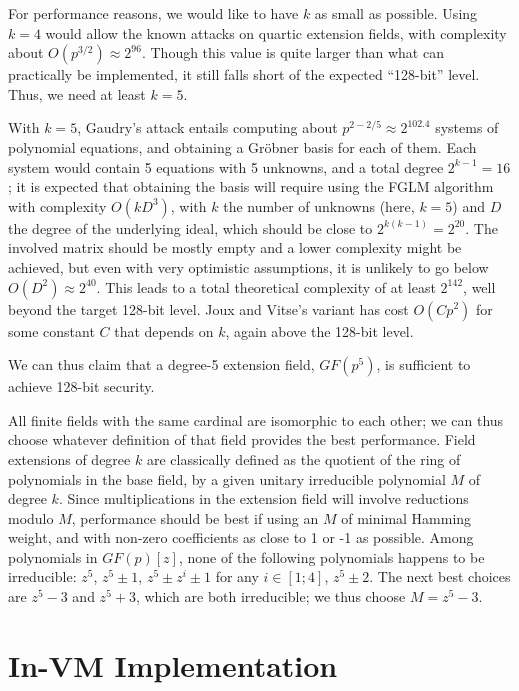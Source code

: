 \documentclass{llncs}
\newcommand{\GF}{GF}
\begin{document}
For performance reasons, we would like to have $k$ as small as possible.
Using $k = 4$ would allow the known attacks on quartic extension
fields\cite{AriMatNagShi2004}, with complexity about $O(p^{3/2}) \approx
2^{96}$. Though this value is quite larger than what can practically be
implemented, it still falls short of the expected ``128-bit'' level.
Thus, we need at least $k = 5$.

With $k = 5$, Gaudry's attack entails computing about $p^{2-2/5} \approx
2^{102.4}$ systems of polynomial equations, and obtaining a Gröbner
basis for each of them. Each system would contain 5 equations with 5
unknowns, and a total degree $2^{k-1} = 16$; it is expected that
obtaining the basis will require using the FGLM
algorithm\cite{FauGiaLazMor1993} with complexity $O(k D^3)$, with $k$
the number of unknowns (here, $k = 5$) and $D$ the degree of the
underlying ideal, which should be close to $2^{k(k-1)} = 2^{20}$. The
involved matrix should be mostly empty and a lower complexity might be
achieved, but even with very optimistic assumptions, it is unlikely to
go below $O(D^2) \approx 2^{40}$. This leads to a total theoretical
complexity of at least $2^{142}$, well beyond the target 128-bit level.
Joux and Vitse's variant has cost $O(C p^2)$ for some constant $C$ that
depends on $k$, again above the 128-bit level.

We can thus claim that a degree-5 extension field, $\GF(p^5)$, is
sufficient to achieve 128-bit security.

All finite fields with the same cardinal are isomorphic to each other;
we can thus choose whatever definition of that field provides the best
performance. Field extensions of degree $k$ are classically defined as
the quotient of the ring of polynomials in the base field, by a given
unitary irreducible polynomial $M$ of degree $k$. Since multiplications
in the extension field will involve reductions modulo $M$, performance
should be best if using an $M$ of minimal Hamming weight, and with
non-zero coefficients as close to 1 or -1 as possible. Among polynomials
in $\GF(p)[z]$, none of the following polynomials happens to be
irreducible: $z^5$, $z^5 \pm 1$, $z^5 \pm z^i \pm 1$ for any $i \in
[1;4]$, $z^5 \pm 2$. The next best choices are $z^5 - 3$ and $z^5 + 3$,
which are both irreducible; we thus choose $M = z^5 - 3$.

\section{In-VM Implementation}
\end{document}
